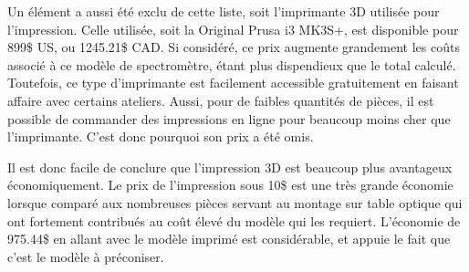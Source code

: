 \documentclass[11pt,letterpaper]{article}
\begin{document}
Un élément a aussi été exclu de cette liste, soit l'imprimante 3D utilisée pour l'impression.
Celle utilisée, soit la Original Prusa i3 MK3S+, est disponible pour 899\$ US, ou 1245.21\$ CAD.
Si considéré, ce prix augmente grandement les coûts associé à ce modèle de spectromètre, étant
plus dispendieux que le total calculé. Toutefois, ce type d'imprimante est facilement accessible
gratuitement en faisant affaire avec certains ateliers. Aussi, pour de faibles quantités de
pièces, il est possible de commander des impressions en ligne pour beaucoup moins cher que
l'imprimante. C'est donc pourquoi son prix a été omis.

Il est donc facile de conclure que l'impression 3D est beaucoup plus avantageux économiquement.
Le prix de l'impression sous 10\$ est une très grande économie lorsque comparé aux nombreuses
pièces servant au montage sur table optique qui ont fortement contribués au coût élevé du
modèle qui les requiert. L'économie de 975.44\$ en allant avec le modèle imprimé est
considérable, et appuie le fait que c'est le modèle à préconiser.



% 
% 
\end{document}
